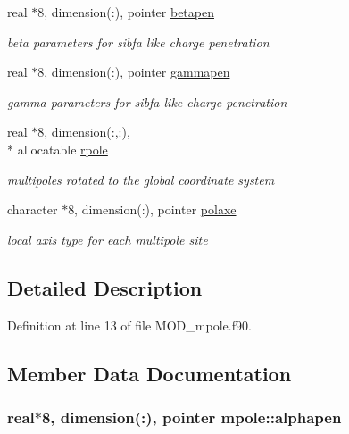 \begin{DoxyCompactItemize}
real $\ast$8, dimension(\-:), pointer \hyperlink{classmpole_afd6e52b962e22a1a1045be134346a2c5}{betapen}
\begin{DoxyCompactList}\small\item\em beta parameters for sibfa like charge penetration \end{DoxyCompactList}\item 
real $\ast$8, dimension(\-:), pointer \hyperlink{classmpole_a8f5c183cec3da1ccc232c2eb1c442f55}{gammapen}
\begin{DoxyCompactList}\small\item\em gamma parameters for sibfa like charge penetration \end{DoxyCompactList}\item 
real $\ast$8, dimension(\-:,\-:), \\*
allocatable \hyperlink{classmpole_ac883646ae13de31cf116db8163b674f6}{rpole}
\begin{DoxyCompactList}\small\item\em multipoles rotated to the global coordinate system \end{DoxyCompactList}\item 
character $\ast$8, dimension(\-:), pointer \hyperlink{classmpole_ad235afbac90e53a4a5d504375546f3d8}{polaxe}
\begin{DoxyCompactList}\small\item\em local axis type for each multipole site \end{DoxyCompactList}\end{DoxyCompactItemize}


\subsection{Detailed Description}


Definition at line 13 of file M\-O\-D\-\_\-mpole.\-f90.



\subsection{Member Data Documentation}
\hypertarget{classmpole_a6156571b658a3a6b485563bcb7bf2ed7}{
\subsubsection[{alphapen}]{\setlength{\rightskip}{0pt plus 5cm}real$\ast$8, dimension(\-:), pointer mpole\-::alphapen}}\label{classmpole_a6156571b658a3a6b485563bcb7bf2ed7}


